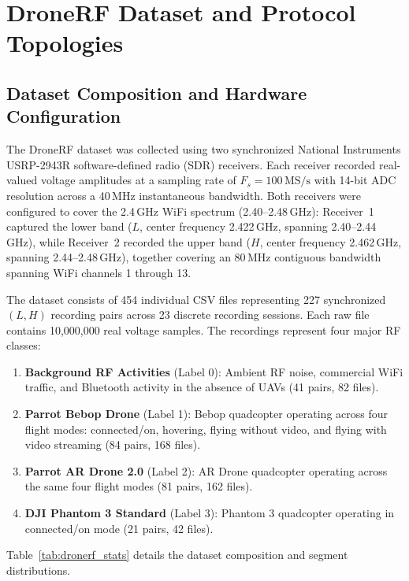 \documentclass[journal,10pt,twocolumn]{IEEEtran}
\begin{document}
\section{DroneRF Dataset and Protocol Topologies}
\subsection{Dataset Composition and Hardware Configuration}
The DroneRF dataset \cite{allahham2019dronerf} was collected using two synchronized National Instruments USRP-2943R software-defined radio (SDR) receivers. Each receiver recorded real-valued voltage amplitudes at a sampling rate of $F_s = 100\,\text{MS/s}$ with 14-bit ADC resolution across a 40\,MHz instantaneous bandwidth. Both receivers were configured to cover the 2.4\,GHz WiFi spectrum (2.40--2.48\,GHz): Receiver~1 captured the lower band ($L$, center frequency 2.422\,GHz, spanning 2.40--2.44\,GHz), while Receiver~2 recorded the upper band ($H$, center frequency 2.462\,GHz, spanning 2.44--2.48\,GHz), together covering an 80\,MHz contiguous bandwidth spanning WiFi channels 1 through 13.

The dataset consists of 454 individual CSV files representing 227 synchronized $(L, H)$ recording pairs across 23 discrete recording sessions. Each raw file contains 10,000,000 real voltage samples. The recordings represent four major RF classes:
\begin{enumerate}
    \item \textbf{Background RF Activities} (Label 0): Ambient RF noise, commercial WiFi traffic, and Bluetooth activity in the absence of UAVs (41 pairs, 82 files).
    \item \textbf{Parrot Bebop Drone} (Label 1): Bebop quadcopter operating across four flight modes: connected/on, hovering, flying without video, and flying with video streaming (84 pairs, 168 files).
    \item \textbf{Parrot AR Drone 2.0} (Label 2): AR Drone quadcopter operating across the same four flight modes (81 pairs, 162 files).
    \item \textbf{DJI Phantom 3 Standard} (Label 3): Phantom 3 quadcopter operating in connected/on mode (21 pairs, 42 files).
\end{enumerate}

Table~\ref{tab:dronerf_stats} details the dataset composition and segment distributions.
\end{document}

